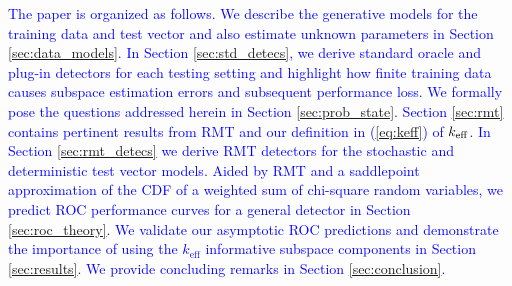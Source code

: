 \textcolor{blue}{The paper is organized as follows. We describe the generative models for the training data and test vector and also estimate unknown parameters in Section \ref{sec:data_models}. In Section \ref{sec:std_detecs}, we derive standard oracle and plug-in detectors for each testing setting and highlight how finite training data causes subspace estimation errors and subsequent performance loss. We formally pose the questions addressed herein in Section \ref{sec:prob_state}. Section \ref{sec:rmt} contains pertinent results from RMT and our definition in (\ref{eq:keff}) of $k_\text{eff}$. In Section \ref{sec:rmt_detecs} we derive RMT detectors for the stochastic and deterministic test vector models. Aided by RMT and a saddlepoint approximation of the CDF of a weighted sum of chi-square random variables, we predict ROC performance curves for a general detector in Section \ref{sec:roc_theory}. We validate our asymptotic ROC predictions and demonstrate the importance of using the $k_\text{eff}$ informative subspace components in Section \ref{sec:results}. We provide concluding remarks in Section \ref{sec:conclusion}.}





